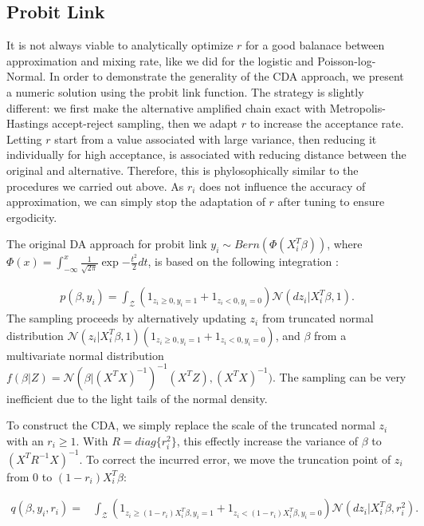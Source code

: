 \documentclass[10pt]{article}
\begin{document}
\subsection{Probit Link}

It is not always viable to analytically optimize $r$ for a good balanace between approximation and mixing rate, like we did for the logistic and Poisson-log-Normal. In order to demonstrate the generality of the CDA approach, we present a numeric solution using the probit link function. The strategy is slightly different: we first make the alternative amplified chain exact with Metropolis-Hastings accept-reject sampling, then we adapt $r$ to increase the acceptance rate. Letting $r$ start from a value associated with large variance, then reducing it individually for high acceptance, is associated with reducing distance between the original and alternative. Therefore, this is phylosophically similar to the procedures we carried out above. As $r_i$ does not influence the accuracy of approximation, we can simply stop the adaptation of $r$ after tuning to ensure ergodicity.

The original DA approach for probit link $y_i\sim Bern( \Phi(X_i^T\beta))$, where $\Phi(x)=\int_{-\infty}^{x} \frac{1}{\sqrt{2{\pi}}} \exp{-\frac{t^2}{2}} dt$, is based on the following integration \citep{albert1993bayesian}:


\begin{equation}
\begin{aligned}
p(\beta,y_i) = \int_{\mathcal{Z}}  ({1}_{z_i \ge 0, y_i=1}+{1}_{z_i<0, y_i=0} )\mathcal{N}( dz_i|X_i^T\beta, 1).
\end{aligned}
\end{equation}
The sampling proceeds by alternatively updating $z_i$ from truncated normal distribution  $\mathcal{N}( z_i|X_i^T\beta, 1) ({1}_{z_i \ge 0, y_i=1}+{1}_{z_i<0, y_i=0} )$, and $\beta$ from a multivariate normal distribution $f(\beta|Z) =\mathcal{N}( \beta|(X^T X)^{-1})^{-1}(X^T Z), (X^T X )^{-1})$. The sampling can be very inefficient due to the light tails of the normal density.

To construct the CDA, we simply replace the scale of the truncated normal $z_i$ with an $r_i \ge 1$. With  $R=diag\{r^2_i\}$, this effectly increase the variance of $\beta$ to $(X^T R^{-1} X )^{-1}$. To correct the incurred error, we move the truncation point of $z_i$ from $0$ to $(1-r_i)X_i^T\beta$:

\begin{equation}
\begin{aligned}
q(\beta, y_i, r_i) = & \int_{\mathcal{Z}}  ({1}_{z_i \ge (1-r_i)X_i^T\beta, y_i=1}+{1}_{z_i<(1-r_i)X_i^T\beta, y_i=0} )\mathcal{N}( dz_i|X_i^T\beta, r_i^2).
\end{aligned}
\end{equation}
\end{document}
